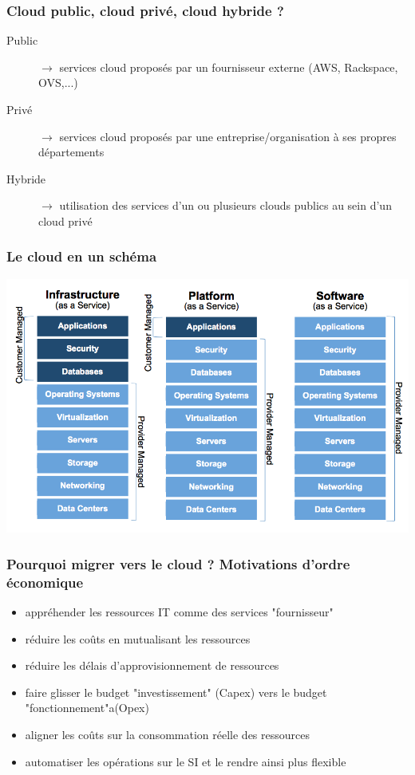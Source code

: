   \begin{frame}
    \frametitle{Cloud public, cloud privé, cloud hybride ?}
    \begin{description}
      \item[Public] $\rightarrow$ services cloud proposés par un fournisseur externe (AWS, Rackspace, OVS,...)\pause
      \item[Privé] $\rightarrow$ services cloud proposés par une entreprise/organisation à ses propres départements\pause 
      \item[Hybride] $\rightarrow$ utilisation des services d'un ou plusieurs clouds publics au sein d'un cloud privé
    \end{description}
  \end{frame}

  \begin{frame}
    \frametitle{Le cloud en un schéma}
    \includegraphics[width=\linewidth,height=\textheight]{images/cloud.png}
  \end{frame}

  \begin{frame}
    \frametitle{Pourquoi migrer vers le cloud ? Motivations d'ordre économique}
    \begin{itemize}
      \item appréhender les ressources IT comme des services "fournisseur"\pause
      \item réduire les coûts en mutualisant les ressources\pause
      \item réduire les délais d'approvisionnement de ressources\pause
      \item faire glisser le budget "investissement" (Capex) vers le budget "fonctionnement"a(Opex)\pause
      \item aligner les coûts sur la consommation réelle des ressources\pause
      \item automatiser les opérations sur le SI et le rendre ainsi plus flexible
    \end{itemize}
  \end{frame}

